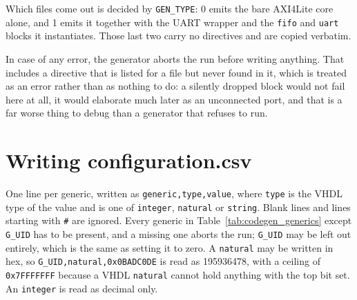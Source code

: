\documentclass[../manual.tex]{subfiles}
\begin{document}
Which files come out is decided by \texttt{GEN\_TYPE}: 0 emits the bare AXI4Lite core alone, and 1 emits it together with the UART wrapper and the \texttt{fifo} and \texttt{uart} blocks it instantiates. Those last two carry no directives and are copied verbatim.

In case of any error, the generator aborts the run before writing anything. That includes a directive that is listed for a file but never found in it, which is treated as an error rather than as nothing to do: a silently dropped block would not fail here at all, it would elaborate much later as an unconnected port, and that is a far worse thing to debug than a generator that refuses to run.

\section{Writing configuration.csv}
\label{sec:codegen_config}

One line per generic, written as \texttt{generic,type,value}, where \texttt{type} is the VHDL type of the value and is one of \texttt{integer}, \texttt{natural} or \texttt{string}. Blank lines and lines starting with \texttt{\#} are ignored. Every generic in Table~\ref{tab:codegen_generics} except \texttt{G\_UID} has to be present, and a missing one aborts the run; \texttt{G\_UID} may be left out entirely, which is the same as setting it to zero. A \texttt{natural} may be written in hex, so \texttt{G\_UID,natural,0x0BADC0DE} is read as 195936478, with a ceiling of \texttt{0x7FFFFFFF} because a VHDL \texttt{natural} cannot hold anything with the top bit set. An \texttt{integer} is read as decimal only.
\end{document}
